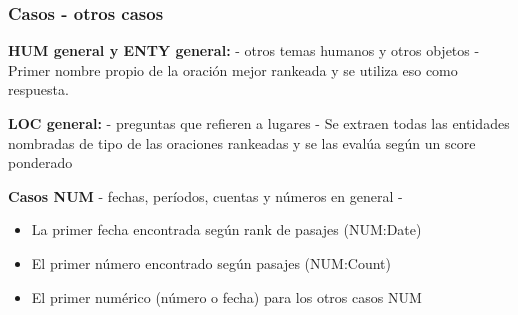 \begin{frame}
\frametitle{Casos - otros casos}

\textbf{HUM general y ENTY general:} - otros temas humanos y otros objetos - Primer nombre propio de la oración mejor rankeada y se utiliza eso como respuesta. \newline

\textbf{LOC general:} - preguntas que refieren a lugares - Se extraen todas las entidades nombradas de tipo  de las oraciones rankeadas y se las evalúa según un score ponderado \newline


\textbf{Casos NUM} - fechas, períodos, cuentas y números en general -
\begin{itemize}
\item La primer fecha encontrada según rank de pasajes (NUM:Date)
\item El primer número encontrado según pasajes (NUM:Count)
\item El primer numérico (número o fecha) para los otros casos NUM
\end{itemize}


\end{frame}


